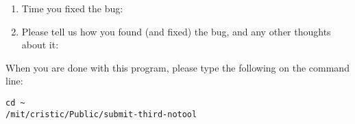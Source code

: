 \documentclass{article}
\begin{document}
\begin{flushleft}
\begin{enumerate}
\item{Time you fixed the bug:}

\item{Please tell us how you found (and fixed) the bug, and any other thoughts 
about it:}

\end{enumerate}

\vspace{0.45in}
When you are done with this program, please type the following on the 
command line:
\begin{verbatim}
cd ~
/mit/cristic/Public/submit-third-notool
\end{verbatim}


\end{flushleft}
\end{document}
